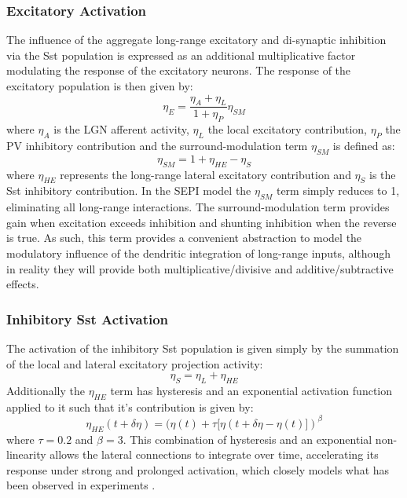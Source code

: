 \subsubsection{Excitatory Activation}

The influence of the aggregate long-range excitatory and di-synaptic
inhibition via the Sst population is expressed as an additional
multiplicative factor modulating the response of the excitatory
neurons. The response of the excitatory population is then given by:
\begin{equation}
  \eta_{E} = \frac{\eta_{A} + \eta_{L}}{1 + \eta_{P}} \eta_{SM}
\end{equation}
where $\eta_{A}$ is the LGN afferent activity, $\eta_{L}$ the local
excitatory contribution, $\eta_{P}$ the PV inhibitory contribution
and the surround-modulation term $\eta_{SM}$ is defined as:
\begin{equation}
  \eta_{SM} = 1 + \eta_{HE} - \eta_{S}
\end{equation}
where $\eta_{HE}$ represents the long-range lateral excitatory
contribution and $\eta_{S}$ is the Sst inhibitory contribution. In
the SEPI model the $\eta_{SM}$ term simply reduces to 1, eliminating
all long-range interactions. The surround-modulation term provides
gain when excitation exceeds inhibition and shunting inhibition when
the reverse is true. As such, this term provides a convenient
abstraction to model the modulatory influence of the dendritic
integration of long-range inputs, although in reality they will
provide both multiplicative/divisive and additive/subtractive effects.

\subsubsection{Inhibitory Sst Activation}

The activation of the inhibitory Sst population is given simply by the
summation of the local and lateral excitatory projection activity:
\begin{equation}
  \eta_{S} = \eta_{L} + \eta_{HE}
\end{equation}
Additionally the $\eta_{HE}$ term has hysteresis and an
exponential activation function applied to it such that it's
contribution is given by:
\begin{equation}
  \eta_{HE} (t + \delta\eta) = (\eta(t) + \tau \big[ \eta(t+\delta\eta - \eta(t) \big])^\beta
\end{equation}
where $\tau=0.2$ and $\beta=3$. This combination of hysteresis and an
exponential non-linearity allows the lateral connections to integrate
over time, accelerating its response under strong and prolonged
activation, which closely models what has been observed in experiments
\citep{Beierlein2003,Bartley2008,Tan2008}.

